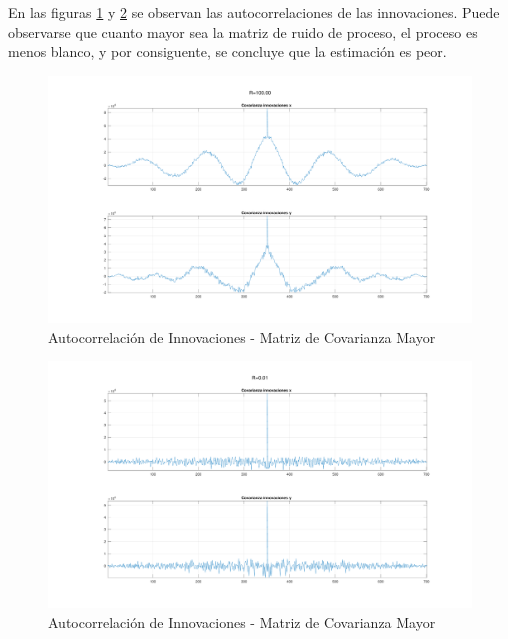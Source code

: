 	En las figuras \ref{fig:ej5r1_innov} y \ref{fig:ej5r2_innov} se observan las autocorrelaciones de las innovaciones. Puede observarse que cuanto mayor sea la matriz de ruido de proceso, el proceso es menos blanco, y por consiguente, se concluye que la estimación es peor.
	
	\begin{figure}[H]
		\centering
		\includegraphics[width=1.0\textwidth,keepaspectratio]{Figuras/covinn_ej6_R1.pdf}
		\caption{Autocorrelación de Innovaciones - Matriz de Covarianza Mayor}
		\label{fig:ej5r1_innov}
	\end{figure}
	
	\begin{figure}[H]
		\centering
		\includegraphics[width=1.0\textwidth,keepaspectratio]{Figuras/covinn_ej6_R2.pdf}
		\caption{Autocorrelación de Innovaciones - Matriz de Covarianza Mayor}
		\label{fig:ej5r2_innov}
	\end{figure}
